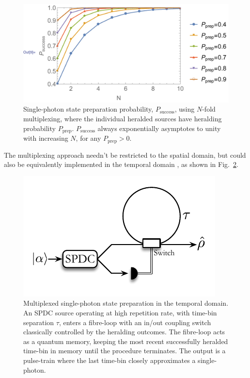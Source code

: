 \documentclass[aps, rmp, twocolumn, amsmath, amssymb, nofootinbib, superscriptaddress, longbibliography, floatfix, table-of-contents, eqsecnum]{revtex4-1}
\begin{document}
\begin{figure}[!htb]
\includegraphics[width=\columnwidth]{SPDC_multiplexing_plot}
\caption{Single-photon state preparation probability, $P_\text{success}$, using $N$-fold multiplexing, where the individual heralded sources have heralding probability $P_\text{prep}$. $P_\text{success}$ always exponentially asymptotes to unity with increasing $N$, for any \mbox{$P_\text{prep}>0$}.} \label{fig:SPDC_multiplexing_plot}
\end{figure}

The multiplexing approach needn't be restricted to the spatial domain, but could also be equivalently implemented in the temporal domain \cite{bib:RohdeLoopMulti15, mosley, othersSeePaper}, as shown in Fig.~\ref{fig:SPDC_time_multiplexing}.

\begin{figure}[!htb]
\includegraphics[width=0.75\columnwidth]{SPDC_time_multiplexing}
\caption{Multiplexed single-photon state preparation in the temporal domain. An SPDC source operating at high repetition rate, with time-bin separation $\tau$, enters a fibre-loop with an in/out coupling switch classically controlled by the heralding outcomes. The fibre-loop acts as a quantum memory, keeping the most recent successfully heralded time-bin in memory until the procedure terminates. The output is a pulse-train where the last time-bin closely approximates a single-photon.} \label{fig:SPDC_time_multiplexing}
\end{figure}
\end{document}
